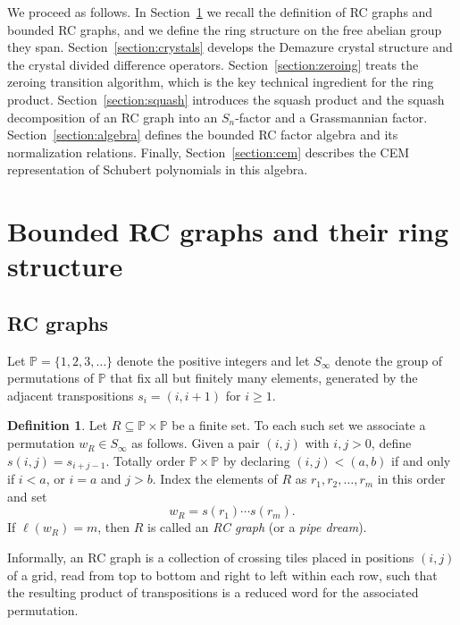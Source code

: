 \documentclass{amsart}
\theoremstyle{definition}
\newtheorem{definition}[lemma]{Definition}
\theoremstyle{remark}
\numberwithin{equation}{section}
\newcommand{\wof}[1]{w_{#1}}
\begin{document}
We proceed as follows.  In Section~\ref{section:bounded-rc} we recall the definition of RC graphs and bounded RC graphs, and we define the ring structure on the free abelian group they span.  Section~\ref{section:crystals} develops the Demazure crystal structure and the crystal divided difference operators.  Section~\ref{section:zeroing} treats the zeroing transition algorithm, which is the key technical ingredient for the ring product.  Section~\ref{section:squash} introduces the squash product and the squash decomposition of an RC graph into an $S_n$-factor and a Grassmannian factor.  Section~\ref{section:algebra} defines the bounded RC factor algebra and its normalization relations.  Finally, Section~\ref{section:cem} describes the CEM representation of Schubert polynomials in this algebra.




\section{Bounded RC graphs and their ring structure}\label{section:bounded-rc}

\subsection{RC graphs}

Let $\mathbb{P} = \{1, 2, 3, \ldots\}$ denote the positive integers and let $S_\infty$ denote the group of permutations of $\mathbb{P}$ that fix all but finitely many elements, generated by the adjacent transpositions $s_i = (i, i+1)$ for $i \geq 1$.

\begin{definition}\label{definition:rcgraph}
Let $R \subseteq \mathbb{P} \times \mathbb{P}$ be a finite set.  To each such set we associate a permutation $\wof{R} \in S_\infty$ as follows.  Given a pair $(i, j)$ with $i, j > 0$, define $s(i,j) = s_{i+j-1}$.  Totally order $\mathbb{P} \times \mathbb{P}$ by declaring $(i, j) < (a, b)$ if and only if $i < a$, or $i = a$ and $j > b$.  Index the elements of $R$ as $r_1, r_2, \ldots, r_m$ in this order and set
\[
\wof{R} = s(r_1) \cdots s(r_m).
\]
If $\ell(\wof{R}) = m$, then $R$ is called an \textit{RC graph} (or a \textit{pipe dream}).
\end{definition}

Informally, an RC graph is a collection of crossing tiles placed in positions $(i, j)$ of a grid, read from top to bottom and right to left within each row, such that the resulting product of transpositions is a reduced word for the associated permutation.
\end{document}
